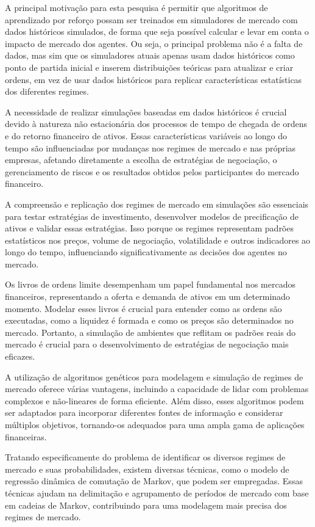 A principal motivação para esta pesquisa é permitir que algoritmos de aprendizado por reforço possam ser treinados em simuladores de mercado com dados históricos simulados, de forma que seja possível calcular e levar em conta o impacto de mercado dos agentes. Ou seja, o principal problema não é a falta de dados, mas sim que os simuladores atuais apenas usam dados históricos como ponto de partida inicial e inserem distribuições teóricas para atualizar e criar ordens, em vez de usar dados históricos para replicar características estatísticas dos diferentes regimes.

A necessidade de realizar simulações baseadas em dados históricos é crucial devido à natureza não estacionária dos processos de tempo de chegada de ordens e do retorno financeiro de ativos. Essas características variáveis ao longo do tempo são influenciadas por mudanças nos regimes de mercado e nas próprias empresas, afetando diretamente a escolha de estratégias de negociação, o gerenciamento de riscos e os resultados obtidos pelos participantes do mercado financeiro.

A compreensão e replicação dos regimes de mercado em simulações são essenciais para testar estratégias de investimento, desenvolver modelos de precificação de ativos e validar essas estratégias. Isso porque os regimes representam padrões estatísticos nos preços, volume de negociação, volatilidade e outros indicadores ao longo do tempo, influenciando significativamente as decisões dos agentes no mercado.

Os livros de ordens limite desempenham um papel fundamental nos mercados financeiros, representando a oferta e demanda de ativos em um determinado momento. Modelar esses livros é crucial para entender como as ordens são executadas, como a liquidez é formada e como os preços são determinados no mercado. Portanto, a simulação de ambientes que reflitam os padrões reais do mercado é crucial para o desenvolvimento de estratégias de negociação mais eficazes.

A utilização de algoritmos genéticos para modelagem e simulação de regimes de mercado oferece várias vantagens, incluindo a capacidade de lidar com problemas complexos e não-lineares de forma eficiente. Além disso, esses algoritmos podem ser adaptados para incorporar diferentes fontes de informação e considerar múltiplos objetivos, tornando-os adequados para uma ampla gama de aplicações financeiras.

Tratando especificamente do problema de identificar os diversos regimes de mercado e suas probabilidades, existem diversas técnicas, como o modelo de regressão dinâmica de comutação de Markov, que podem ser empregadas. Essas técnicas ajudam na delimitação e agrupamento de períodos de mercado com base em cadeias de Markov, contribuindo para uma modelagem mais precisa dos regimes de mercado.

